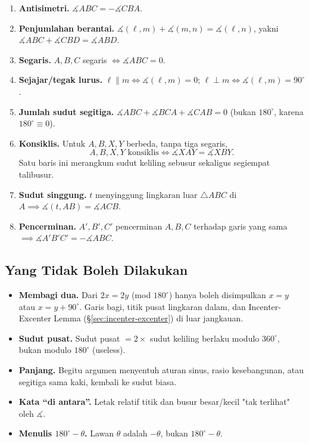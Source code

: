 \documentclass[letterpaper, 13pt]{scrartcl}
\begin{document}
\begin{enumerate}
  \item \textbf{Antisimetri.} $\measuredangle ABC = -\measuredangle CBA$.
  \item \textbf{Penjumlahan berantai.} $\measuredangle(\ell, m) + \measuredangle(m, n) = \measuredangle(\ell, n)$, yakni $\measuredangle ABC + \measuredangle CBD = \measuredangle ABD$.
  \item \textbf{Segaris.} $A, B, C$ segaris $\iff \measuredangle ABC = 0$.
  \item \textbf{Sejajar/tegak lurus.} $\ell \parallel m \iff \measuredangle(\ell,m) = 0$; \quad $\ell \perp m \iff \measuredangle(\ell,m) = 90^\circ$.
  \item \textbf{Jumlah sudut segitiga.} $\measuredangle ABC + \measuredangle BCA + \measuredangle CAB = 0$ (bukan $180^\circ$, karena $180^\circ \equiv 0$).
  \item \textbf{Konsiklis.} Untuk $A, B, X, Y$ berbeda, tanpa tiga segaris,
  \[
  A, B, X, Y \text{ konsiklis} \iff \measuredangle XAY = \measuredangle XBY.
  \]
  Satu baris ini merangkum sudut keliling sebusur sekaligus segiempat talibusur.
  \item \textbf{Sudut singgung.} $t$ menyinggung lingkaran luar $\triangle ABC$ di $A \implies \measuredangle(t, AB) = \measuredangle ACB$.
  \item \textbf{Pencerminan.} $A', B', C'$ pencerminan $A, B, C$ terhadap garis yang sama $\implies \measuredangle A'B'C' = -\measuredangle ABC$.
\end{enumerate}

\subsection{Yang Tidak Boleh Dilakukan}

\begin{itemize}
  \item \textbf{Membagi dua.} Dari $2x = 2y$ (mod $180^\circ$) hanya boleh disimpulkan $x = y$ atau $x = y + 90^\circ$. Garis bagi, titik pusat lingkaran dalam, dan Incenter-Excenter Lemma (\S\ref{sec:incenter-excenter}) di luar jangkauan.
  \item \textbf{Sudut pusat.} Sudut pusat $= 2 \times$ sudut keliling berlaku modulo $360^\circ$, bukan modulo $180^\circ$ (useless).
  \item \textbf{Panjang.} Begitu argumen menyentuh aturan sinus, rasio kesebangunan, atau segitiga sama kaki, kembali ke sudut biasa.
  \item \textbf{Kata ``di antara''.} Letak relatif titik dan busur besar/kecil "tak terlihat" oleh $\measuredangle$.
  \item \textbf{Menulis $180^\circ - \theta$.} Lawan $\theta$ adalah $-\theta$, bukan $180^\circ - \theta$.
\end{itemize}
\end{document}

